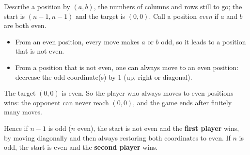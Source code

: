 Describe a position by $(a,b)$, the numbers of columns and rows still to go; the start is $(n-1,n-1)$ and the target is $(0,0)$. Call a position \emph{even} if $a$ and $b$ are both even.
\begin{itemize}
\item From an even position, every move makes $a$ or $b$ odd, so it leads to a position that is not even.
\item From a position that is not even, one can always move to an even position: decrease the odd coordinate(s) by $1$ (up, right or diagonal).
\end{itemize}
The target $(0,0)$ is even. So the player who always moves to even positions wins: the opponent can never reach $(0,0)$, and the game ends after finitely many moves.

Hence if $n-1$ is odd ($n$ even), the start is not even and the \textbf{first player} wins, by moving diagonally and then always restoring both coordinates to even. If $n$ is odd, the start is even and the \textbf{second player} wins.
